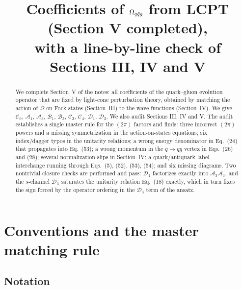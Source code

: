 \documentclass[11pt]{article}
\title{\bf Coefficients of $\OM_{q\bar q g}$ from LCPT (Section V completed),\\
with a line-by-line check of Sections III, IV and V}
\date{}\author{}
\newcommand{\OM}{\Omega}
\begin{document}
\maketitle
\vspace{-1.2cm}

\begin{abstract}\noindent
We complete Section~V of the notes: all coefficients of the quark--gluon evolution operator that
are fixed by light-cone perturbation theory, obtained by matching the action of $\OM$ on Fock
states (Section~III) to the wave functions (Section~IV). We give
$\mathcal C_0$, $\mathcal A_1$, $\mathcal A_3$, $\mathcal B_1$, $\mathcal B_3$, $\mathcal C_3$,
$\mathcal C_4$, $\mathcal D_1$, $\mathcal D_3$. We also audit Sections III, IV and V. The audit
establishes a single master rule for the $(2\pi)$ factors and finds: three incorrect $(2\pi)$
powers and a missing symmetrization in the action-on-states equations; six index/dagger typos in
the unitarity relations; a wrong energy denominator in Eq.~(24) that propagates into Eq.~(53); a
wrong momentum in the $q\to qg$ vertex in Eqs.~(26) and (28); several normalization slips in
Section~IV; a quark/antiquark label interchange running through Eqs.~(5), (52), (53), (54); and
six missing diagrams. Two nontrivial closure checks are performed and pass: $\mathcal D_1$
factorizes exactly into $\mathcal A_3\mathcal A_3$, and the $s$-channel $\mathcal D_3$ saturates
the unitarity relation Eq.~(18) exactly, which in turn fixes the sign forced by the operator
ordering in the $\mathcal D_3$ term of the ansatz.
\end{abstract}

\tableofcontents\bigskip

\section{Conventions and the master matching rule}

\subsection{Notation}
\end{document}
